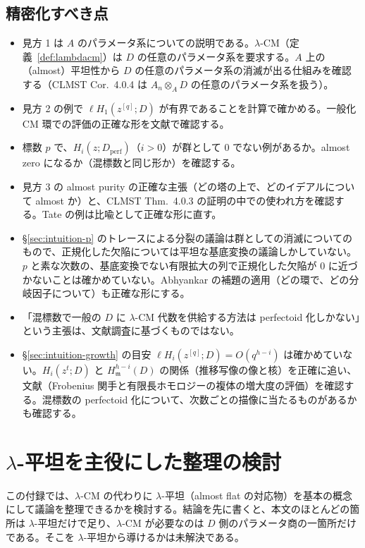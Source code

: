 \documentclass[11pt,a4paper]{ltjsarticle}
\numberwithin{equation}{section}
\theoremstyle{plain}
\theoremstyle{definition}
\theoremstyle{definition}
\newcommand{\m}{\mathfrak{m}}
\begin{document}
\subsection{精密化すべき点}
\begin{itemize}
  \item 見方 1 は $A$ のパラメータ系についての説明である。$\lambda$-CM（定義~\ref{def:lambdacm}）は $D$ の任意のパラメータ系を要求する。$A$ 上の（almost）平坦性から $D$ の任意のパラメータ系の消滅が出る仕組みを確認する（CLMST Cor.~4.0.4 は $A_n\otimes_A D$ の任意のパラメータ系を扱う）。
  \item 見方 2 の例で $\ell H_1(z^{[q]};D)$ が有界であることを計算で確かめる。一般化 CM 環での評価の正確な形を文献で確認する。
  \item 標数 $p$ で、$H_i(z;D_{\mathrm{perf}})$（$i>0$）が群として $0$ でない例があるか。almost zero になるか（混標数と同じ形か）を確認する。
  \item 見方 3 の almost purity の正確な主張（どの塔の上で、どのイデアルについて almost か）と、CLMST Thm.~4.0.3 の証明の中での使われ方を確認する。Tate の例は比喩として正確な形に直す。
  \item \S\ref{sec:intuition-p} のトレースによる分裂の議論は群としての消滅についてのもので、正規化した欠陥については平坦な基底変換の議論しかしていない。$p$ と素な次数の、基底変換でない有限拡大の列で正規化した欠陥が $0$ に近づかないことは確かめていない。Abhyankar の補題の適用（どの環で、どの分岐因子について）も正確な形にする。
  \item 「混標数で一般の $D$ に $\lambda$-CM 代数を供給する方法は perfectoid 化しかない」という主張は、文献調査に基づくものではない。
  \item \S\ref{sec:intuition-growth} の目安 $\ell H_i(z^{[q]};D) = O(q^{h-i})$ は確かめていない。$H_i(z^t;D)$ と $H^{h-i}_\m(D)$ の関係（推移写像の像と核）を正確に追い、文献（Frobenius 関手と有限長ホモロジーの複体の増大度の評価）を確認する。混標数の perfectoid 化について、次数ごとの描像に当たるものがあるかも確認する。
\end{itemize}

\section{$\lambda$-平坦を主役にした整理の検討}\label{sec:lflat}

この付録では、$\lambda$-CM の代わりに $\lambda$-平坦（almost flat の対応物）を基本の概念にして議論を整理できるかを検討する。結論を先に書くと、本文のほとんどの箇所は $\lambda$-平坦だけで足り、$\lambda$-CM が必要なのは $D$ 側のパラメータ商の一箇所だけである。そこを $\lambda$-平坦から導けるかは未解決である。
\end{document}
